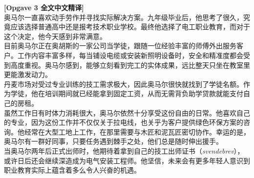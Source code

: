 \begin{transbox}
\small
\textbf{\color{NCDTeal}[Opgave 3 全文中文精译]}\\
奥马尔一直喜欢动手劳作并寻找实际解决方案。九年级毕业后，他思考了很久，究竟应该选择普通高中还是报考技术职业学校。最终他选择了电工职业教育，而对于这个决定，他今天感到非常满意。\\[3pt]
目前奥马尔正在奥胡斯的一家公司当学徒，跟随一位经验丰富的师傅外出服务客户。工作内容丰富多样，每当铺设电缆或安装新照明设备时，安全和精准度都会受到高度重视。奥马尔感到，能够立刻看到完工的实体成果，远比整天只坐在教室里更能激发动力。\\[3pt]
丹麦市场对受过专业训练的技工需求极大，因此奥马尔很快就找到了学徒名额。作为学徒，他在培训期间就已经能拿到固定工资，从而无需背负助学贷款就能支付自己的房租。\\[3pt]
虽然工作日有时体力消耗很大，奥马尔依然十分享受这份自由的日常。他喜欢自己的专业，因为这份工作并不仅仅关于拉电线，也关乎为客户提供绿色环保方案的咨询。他经常在大型工地上工作，在那里需要与木匠和泥瓦匠密切协作。幸运的是，奥马尔有一群好同事，只要任务遇到棘手之处，他们总是随时伸出援手。\\[3pt]
当奥马尔两年后正式出师时，他期待着拿到自己的技工出师证书（\textit{svendebrev}），或许日后还会继续深造成为电气安装工程师。他坚信，未来会有更多年轻人意识到职业教育实际上蕴含着多么令人兴奋的机遇。
\end{transbox}

